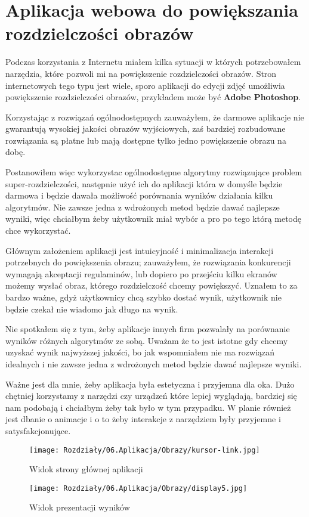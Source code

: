 \chapter{Aplikacja webowa do powiększania rozdzielczości obrazów} \label{chap:app}

Podczas korzystania z Internetu miałem kilka sytuacji w których potrzebowałem narzędzia, które pozwoli mi na powiększenie rozdzielczości obrazów. Stron internetowych tego typu jest wiele, sporo aplikacji do edycji zdjęć umożliwia powiększenie rozdzielczości obrazów, przykładem może być \textbf{Adobe Photoshop}.

Korzystając z rozwiązań ogólnodostępnych zauważyłem, że darmowe aplikacje nie gwarantują wysokiej jakości obrazów wyjściowych, zaś bardziej rozbudowane rozwiązania są płatne lub mają dostępne tylko jedno powiększenie obrazu na dobę. 

Postanowiłem więc wykorzystac ogólnodostępne algorytmy rozwiązujące problem super-rozdzielczości, następnie użyć ich do aplikacji która w domyśle będzie darmowa i będzie dawała możliwość porównania wyników działania kilku algorytmów. Nie zawsze jedna z wdrożonych metod będzie dawać najlepsze wyniki, więc chciałbym żeby użytkownik miał wybór a pro po tego którą metodę chce wykorzystać.

Głównym założeniem aplikacji jest intuicyjność i minimalizacja interakcji potrzebnych do powiększenia obrazu; zauważyłem, że rozwiązania konkurencji wymagają akceptacji regulaminów, lub dopiero po przejściu kilku ekranów możemy wysłać obraz, którego rozdzielczość chcemy powiększyć. Uznałem to za bardzo ważne, gdyż użytkownicy chcą szybko dostać wynik, użytkownik nie będzie czekał nie wiadomo jak długo na wynik.

Nie spotkałem się z tym, żeby aplikacje innych firm pozwalały na porównanie wyników różnych algorytmów ze sobą. Uważam że to jest istotne gdy chcemy uzyskać wynik najwyższej jakości, bo jak wspomniałem nie ma rozwiązań idealnych i nie zawsze jedna z wdrożonych metod będzie dawać najlepsze wyniki.

Ważne jest dla mnie, żeby aplikacja była estetyczna i przyjemna dla oka. Dużo chętniej korzystamy z narzędzi czy urządzeń które lepiej wyglądają, bardziej się nam podobają i chciałbym żeby tak było w tym przypadku. W planie również jest dbanie o animacje i o to żeby interakcje z narzędziem były przyjemne i satysfakcjonujące.

\newpage
\begin{figure}[H]
    \begin{minipage}{\linewidth}
        \centering
        \texttt{[image: Rozdziały/06.Aplikacja/Obrazy/kursor-link.jpg]}  
        \caption{Widok strony głównej aplikacji}
        \label{fig:image80}
        \hspace{2cm}
        \texttt{[image: Rozdziały/06.Aplikacja/Obrazy/display5.jpg]}  
        \caption{Widok prezentacji wyników}
        \label{fig:image81}
    \end{minipage}
\end{figure}
\newpage

